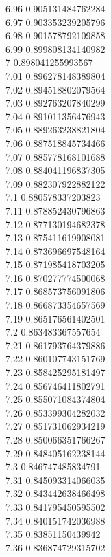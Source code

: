 {6.96	0.905131484762284\\
6.97	0.903353239205796\\
6.98	0.901578792109858\\
6.99	0.899808134140982\\
7	0.898041255993567\\
7.01	0.896278148389804\\
7.02	0.894518802079564\\
7.03	0.892763207840299\\
7.04	0.891011356476943\\
7.05	0.889263238821804\\
7.06	0.887518845734466\\
7.07	0.885778168101688\\
7.08	0.884041196837305\\
7.09	0.882307922882122\\
7.1	0.880578337203823\\
7.11	0.878852430796863\\
7.12	0.877130194682378\\
7.13	0.875411619908081\\
7.14	0.873696697548164\\
7.15	0.871985418703205\\
7.16	0.870277774500068\\
7.17	0.868573756091806\\
7.18	0.866873354657569\\
7.19	0.865176561402501\\
7.2	0.863483367557654\\
7.21	0.861793764379886\\
7.22	0.860107743151769\\
7.23	0.858425295181497\\
7.24	0.856746411802791\\
7.25	0.855071084374804\\
7.26	0.853399304282032\\
7.27	0.851731062934219\\
7.28	0.850066351766267\\
7.29	0.848405162238144\\
7.3	0.846747485834791\\
7.31	0.845093314066035\\
7.32	0.843442638466498\\
7.33	0.841795450595502\\
7.34	0.840151742036988\\
7.35	0.83851150439942\\
7.36	0.836874729315702\\
}
